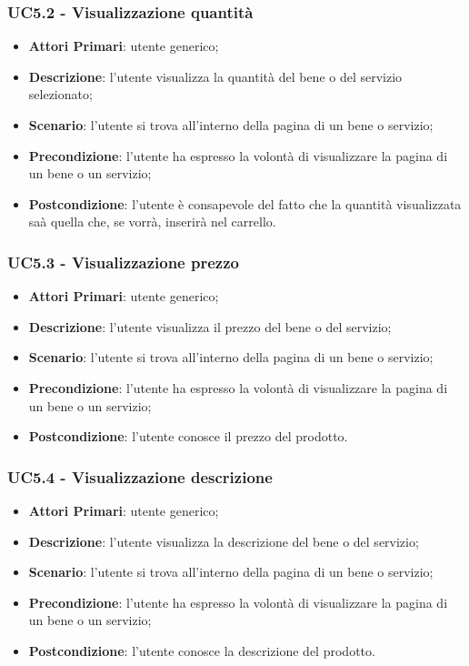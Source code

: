  \subsubsection{UC5.2 - Visualizzazione quantità}
\begin{itemize}
	\item \textbf{Attori Primari}: utente generico;
	\item \textbf{Descrizione}: l'utente visualizza la quantità del bene o del servizio selezionato;
	\item \textbf{Scenario}: l'utente si trova all'interno della pagina di un bene o servizio;
	\item \textbf{Precondizione}: l'utente ha espresso la volontà di visualizzare la pagina di un bene o un servizio;
	\item \textbf{Postcondizione}: l'utente è consapevole del fatto che la quantità visualizzata saà quella che, se vorrà, inserirà nel carrello.
\end{itemize}
 \subsubsection{UC5.3 - Visualizzazione prezzo}
\begin{itemize}
	\item \textbf{Attori Primari}: utente generico;
	\item \textbf{Descrizione}: l'utente visualizza il prezzo del bene o del servizio;
	\item \textbf{Scenario}: l'utente si trova all'interno della pagina di un bene o servizio;
	\item \textbf{Precondizione}: l'utente ha espresso la volontà di visualizzare la pagina di un bene o un servizio;
	\item \textbf{Postcondizione}: l'utente conosce il prezzo del prodotto.
\end{itemize}
 \subsubsection{UC5.4 - Visualizzazione descrizione}
\begin{itemize}
	\item \textbf{Attori Primari}: utente generico;
	\item \textbf{Descrizione}: l'utente visualizza la descrizione del bene o del servizio;
	\item \textbf{Scenario}: l'utente si trova all'interno della pagina di un bene o servizio;
	\item \textbf{Precondizione}: l'utente ha espresso la volontà di visualizzare la pagina di un bene o un servizio;
	\item \textbf{Postcondizione}: l'utente conosce la descrizione del prodotto.
\end{itemize}